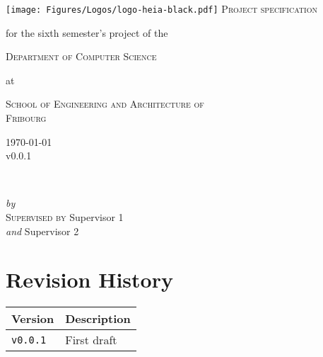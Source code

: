 \begin{titlepage}
	\begin{center}
	    \texttt{[image: Figures/Logos/logo-heia-black.pdf]}
	    \vskip 2cm
		\textsc{\huge Project specification}
        \vskip 1cm
        \begin{large}
          for the sixth semester's project of the\\[0.50cm]
          \begin{Large}
            \textsc{Department of Computer Science}\\[0.50cm]
          \end{Large}
          at\\[0.50cm]
          \begin{Large}
            \textsc{School of Engineering and Architecture of\\Fribourg}\par
          \end{Large}
        \end{large}
		\vfill
        \today \\
        v0.0.1
	\end{center}
\end{titlepage}


\begin{titlepage}
  \vspace*{5cm}
  \makeatletter
  \begin{center}
    \begin{Huge}
      \@title
    \end{Huge}\\[0.1cm]
    \begin{Large}
      \@subtitle
    \end{Large}
    \vskip 0.25cm
    \emph{by}
    \vskip 0.25cm
    \@author \\
    \vfill
    \textsc{Supervised by}
    \vskip 0.25cm
    Supervisor 1\\
    \vskip 0.1cm
    \emph{and}
    \vskip 0.1cm
    Supervisor 2\\
  \end{center}
  
  \makeatother
\end{titlepage}

\cleardoublepage


\chapter*{Revision History}
\begin{table}[h]
  \centering
  \begin{tabularx}{\textwidth}{ll}
    \toprule
    \textbf{Version}           & \textbf{Description}\\
    \midrule
      \texttt{v0.0.1}          & First draft\\
    \bottomrule
  \end{tabularx}
\end{table}


\thispagestyle{empty}
\cleardoublepage
